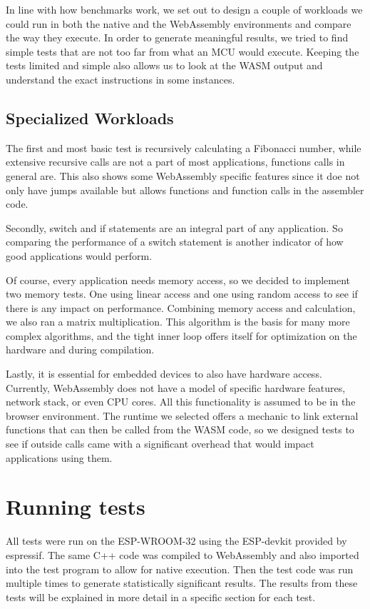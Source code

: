 In line with how benchmarks work, we set out to design a couple of workloads we could run in both the native and the WebAssembly environments and compare the way they execute. In order to generate meaningful results, we tried to find simple tests that are not too far from what an MCU would execute. Keeping the tests limited and simple also allows us to look at the WASM output and understand the exact instructions in some instances.

\subsection{Specialized Workloads}

The first and most basic test is recursively calculating a Fibonacci number, while extensive recursive calls are not a part of most applications, functions calls in general are. This also shows some WebAssembly specific features since it doe not only have jumps available but allows functions and function calls in the assembler code.

Secondly, switch and if statements are an integral part of any application. So comparing the performance of a switch statement is another indicator of how good applications would perform.

Of course, every application needs memory access, so we decided to implement two memory tests. One using linear access and one using random access to see if there is any impact on performance. Combining memory access and calculation, we also ran a matrix multiplication. This algorithm is the basis for many more complex algorithms, and the tight inner loop offers itself for optimization on the hardware and during compilation.

Lastly, it is essential for embedded devices to also have hardware access. Currently, WebAssembly does not have a model of specific hardware features, network stack, or even CPU cores. All this functionality is assumed to be in the browser environment. The runtime we selected offers a mechanic to link external functions that can then be called from the WASM code, so we designed tests to see if outside calls came with a significant overhead that would impact applications using them.

\section{Running tests}

All tests were run on the ESP-WROOM-32 using the ESP-devkit provided by espressif. The same C++ code was compiled to WebAssembly and also imported into the test program to allow for native execution. Then the test code was run multiple times to generate statistically significant results. The results from these tests will be explained in more detail in a specific section for each test.

